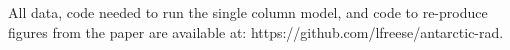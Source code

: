 \documentclass[draft]{agujournal2019}
\begin{document}
%




%
%
%
%
%
%
%
%


\acknowledgments
All data, code needed to run the single column model, and code to re-produce figures from the paper are available at: https://github.com/lfreese/antarctic-rad. 



%
%





%
%
%
%
%
\end{document}
